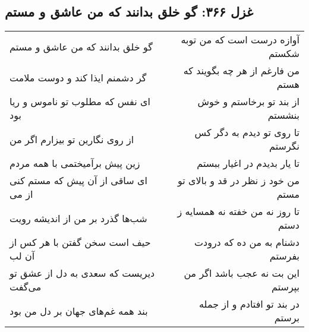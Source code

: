 \begin{center}
\section*{غزل ۳۶۶: گو خلق بدانند که من عاشق و مستم}
\label{sec:366}
\begin{longtable}{l p{0.5cm} r}
گو خلق بدانند که من عاشق و مستم
&&
آوازه درست است که من توبه شکستم
\\
گر دشمنم ایذا کند و دوست ملامت
&&
من فارغم از هر چه بگویند که هستم
\\
ای نفس که مطلوب تو ناموس و ریا بود
&&
از بند تو برخاستم و خوش بنشستم
\\
از روی نگارین تو بیزارم اگر من
&&
تا روی تو دیدم به دگر کس نگرستم
\\
زین پیش برآمیختمی با همه مردم
&&
تا یار بدیدم در اغیار ببستم
\\
ای ساقی از آن پیش که مستم کنی از می
&&
من خود ز نظر در قد و بالای تو مستم
\\
شب‌ها گذرد بر من از اندیشه رویت
&&
تا روز نه من خفته نه همسایه ز دستم
\\
حیف است سخن گفتن با هر کس از آن لب
&&
دشنام به من ده که درودت بفرستم
\\
دیریست که سعدی به دل از عشق تو می‌گفت
&&
این بت نه عجب باشد اگر من بپرستم
\\
بند همه غم‌های جهان بر دل من بود
&&
در بند تو افتادم و از جمله برستم
\\
\end{longtable}
\end{center}
